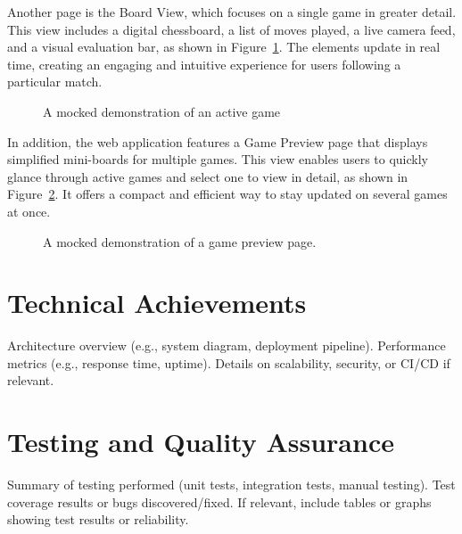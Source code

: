 Another page is the Board View, which focuses on a single game in greater detail. This view includes a digital chessboard, a list of moves played, a live camera feed, and a visual evaluation bar, as shown in Figure~\ref{fig:board-view-mocked}. The elements update in real time, creating an engaging and intuitive experience for users following a particular match. \\

\begin{figure}[h!] \centering {}\caption[Display of a board]{A mocked demonstration of an active game}\label{fig:board-view-mocked} \end{figure}

In addition, the web application features a Game Preview page that displays simplified mini-boards for multiple games. This view enables users to quickly glance through active games and select one to view in detail, as shown in Figure~\ref{fig:game-preview}. It offers a compact and efficient way to stay updated on several games at once. \\

\begin{figure}[h!] \centering {}\caption[Preview of active games]{A mocked demonstration of a game preview page.}\label{fig:game-preview} \end{figure}

\section{Technical Achievements}
Architecture overview (e.g., system diagram, deployment pipeline). Performance metrics (e.g., response time, uptime). Details on scalability, security, or CI/CD if relevant. 

\section{Testing and Quality Assurance}
Summary of testing performed (unit tests, integration tests, manual testing). Test coverage results or bugs discovered/fixed. If relevant, include tables or graphs showing test results or reliability.